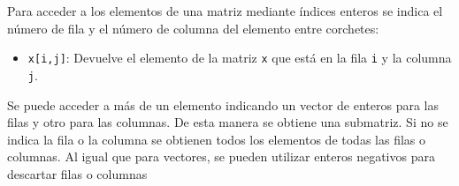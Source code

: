 \documentclass[
  a4paper,
]{scrreport}
\providecommand{\tightlist}{%
  \setlength{\itemsep}{0pt}\setlength{\parskip}{0pt}}\usepackage{longtable,booktabs,array}
\theoremstyle{definition}
\theoremstyle{definition}
\theoremstyle{remark}
\begin{document}
Para acceder a los elementos de una matriz mediante índices enteros se
indica el número de fila y el número de columna del elemento entre
corchetes:

\begin{itemize}
\tightlist
\item
  \texttt{x{[}i,j{]}}: Devuelve el elemento de la matriz \texttt{x} que
  está en la fila \texttt{i} y la columna \texttt{j}.
\end{itemize}

Se puede acceder a más de un elemento indicando un vector de enteros
para las filas y otro para las columnas. De esta manera se obtiene una
submatriz. Si no se indica la fila o la columna se obtienen todos los
elementos de todas las filas o columnas. Al igual que para vectores, se
pueden utilizar enteros negativos para descartar filas o columnas
\end{document}
